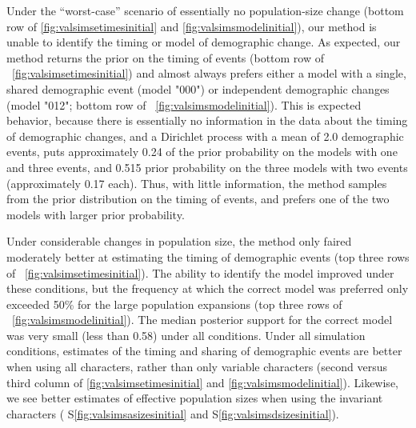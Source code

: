 \ifembed{

}{}

\ifembed{

}{}

Under the ``worst-case'' scenario of essentially no population-size change
(bottom row of \figs \ref{fig:valsimsetimesinitial} and
\ref{fig:valsimsmodelinitial}),
our method is unable to identify the timing or model of demographic change.
As expected, our method returns the prior on the timing of events 
(bottom row of \fig{}~\ref{fig:valsimsetimesinitial})
and almost always prefers either a model with a single, shared demographic
event (model "000") or independent demographic changes (model "012";
bottom row of \fig{}~\ref{fig:valsimsmodelinitial}).
This is expected behavior, because there is essentially no information in the
data about the timing of demographic changes, and a Dirichlet process with a
mean of 2.0 demographic events, puts approximately 0.24 of the prior
probability on the models with one and three events, and 0.515 prior
probability on the three models with two events (approximately 0.17 each).
Thus, with little information, the method samples from the prior distribution
on the timing of events, and prefers one of the two models with larger prior
probability.

Under considerable changes in population size, the method only faired
moderately better at estimating the timing of demographic events
(top three rows of \fig{}~\ref{fig:valsimsetimesinitial}).
The ability to identify the model improved under these
conditions, but the frequency at which the correct model
was preferred only exceeded 50\% for the large population
expansions
(top three rows of \fig{}~\ref{fig:valsimsmodelinitial}).
The median posterior support for the correct model was very small (less than
0.58) under all conditions.
Under all simulation conditions, estimates of the timing and sharing of
demographic events are better when using all characters, rather than only
variable characters
(second versus third column of \figs
\ref{fig:valsimsetimesinitial}
and
\ref{fig:valsimsmodelinitial}).
Likewise, we see better estimates of effective population sizes when using the
invariant characters
(\figs
S\ref{fig:valsimsasizesinitial}
and
S\ref{fig:valsimsdsizesinitial}).


